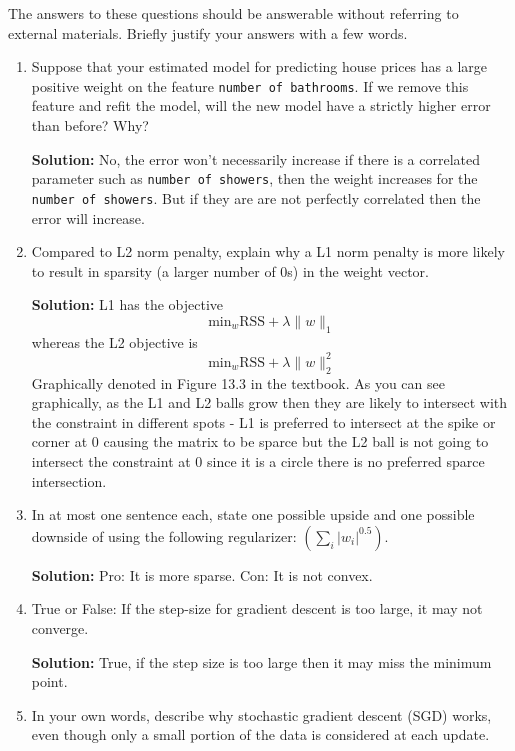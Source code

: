 \documentclass[shortlabels]{article}
\begin{document}
\begin{aprob}
    The answers to these questions should be answerable without referring to external materials.  Briefly justify your answers with a few words.
    \begin{enumerate}
      \item {} Suppose that your estimated model for predicting house prices has a large positive weight on the feature \texttt{number of bathrooms}. If we remove this feature and refit the model, will the new model have a strictly higher error than before? Why?

      \textbf{Solution:} No,  the error won't necessarily increase if there is a correlated parameter such as \texttt{number of showers}, then the weight increases for the \texttt{number of showers}. But if they are are not perfectly correlated then the error will increase.
      \newpage
      \item {} Compared to L2 norm penalty, explain why a L1 norm penalty is more likely to result in sparsity (a larger number of 0s) in the weight vector.

      \textbf{Solution:} L1 has the objective $$ \text{min}_w \text{RSS} + \lambda \| w \|_1$$ whereas the L2 objective is $$ \text{min}_w \text{RSS} + \lambda \| w \|_2^2 $$ Graphically denoted in Figure 13.3 in the textbook. As you can see graphically, as the L1 and L2 balls grow then they are likely to intersect with the constraint in different spots - L1 is preferred to intersect at the spike or corner at 0 causing the matrix to be sparce but the L2 ball is not going to intersect the constraint at 0 since it is a circle there is no preferred sparce intersection. 
      \newpage
      \item {} In at most one sentence each, state one possible upside and one possible downside of using the following regularizer: $\left(\sum_{i}\left|w_{i}\right|^{0.5}\right)$.

      \textbf{Solution:} Pro: It is more sparse. Con: It is not convex.
      \newpage
      \item {} True or False: If the step-size for gradient descent is too large, it may not converge.

      \textbf{Solution:} True, if the step size is too large then it may miss the minimum point.
      \newpage
      \item {} In your own words, describe why stochastic gradient descent (SGD) works, even though only a small portion of the data is considered at each update.


\end{enumerate}
\end{aprob}
\end{document}
